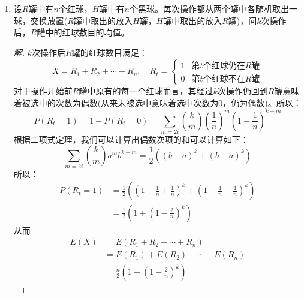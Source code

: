 \documentclass[12pt]{article}
\newcommand{\hei}{\CJKfamily{hei}}                          %
\begin{document}
\begin{enumerate}
\item {\hei 设$R$罐中有$n$个红球，$H$罐中有$n$个黑球。每次操作都从两个罐中各随机取出一球，交换放置($R$罐中取出的放入$H$罐，$H$罐中取出的放入$R$罐)，问$k$次操作后，$R$罐中的红球数目的均值。}

\begin{proof}[解]
	$k$次操作后$R$罐的红球数目满足：
	\begin{equation}
	X=R_1+R_2+\cdots+R_n,\quad R_t=\left\{
	\begin{array}{cc}
	1 & \mbox{第$t$个红球仍在$R$罐}\\
	0 & \mbox{第$t$个红球不在$R$罐}
	\end{array}
	\right.
	\end{equation}
	对于操作开始前$R$罐中原有的每一个红球而言，其经过$k$次操作仍回到$R$罐意味着被选中的次数为偶数(从来未被选中意味着选中次数为0，仍为偶数)。所以：
	\begin{equation}
	P(R_t=1)=1-P(R_t=0)=\sum_{m=2i}\binom{k}{m}\left(\frac{1}{n}\right)^m\left(1-\frac{1}{n}\right)^{k-m}
	\end{equation}
	根据二项式定理，我们可以计算出偶数次项的和可以计算如下：
	\begin{equation}
	\sum_{m=2i}\binom{k}{m}a^mb^{k-m}=\frac{1}{2}\left(\left(b+a\right)^k+\left(b-a\right)^k\right)
	\end{equation}
	所以：
	\begin{equation}\begin{aligned}
	P(R_t=1)&=\frac{1}{2}\left(\left(1-\frac{1}{n}+\frac{1}{n}\right)^k+\left(1-\frac{1}{n}-\frac{1}{n}\right)^k\right) \\
	&=\frac{1}{2}\left(1+\left(1-\frac{2}{n}\right)^k\right) 
	\end{aligned}
	\end{equation}
	从而
	\begin{equation}
	\begin{aligned}
	E(X)&=E(R_1+R_2+\cdots+R_n) \\
	&=E(R_1)+E(R_2)+\cdots+E(R_n) \\
	&=\frac{n}{2}\left(1+\left(1-\frac{2}{n}\right)^k\right)
	\end{aligned}
	\end{equation}
\end{proof}


\end{enumerate}
\end{document}
